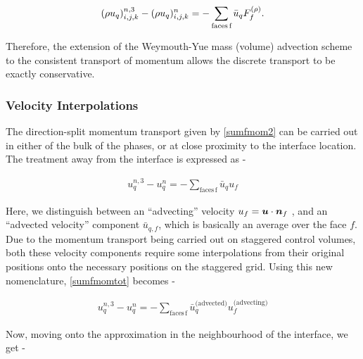 \begin{align}
	{(\rho u_{q})_{i,j,k}^{n,3} - (\rho u_{q})_{i,j,k}^{n}} =  - \sum_{\textrm{faces} \, \textrm{f}}  \bar u_{q}  F^{(\rho)}_{f} . 
\label{sumfmomtotfracstep}
\end{align}


Therefore, the extension of the Weymouth-Yue mass (volume) 
advection scheme to the consistent
transport of momentum allows the discrete 
transport to be exactly conservative. 


\subsubsection*{Velocity Interpolations}


The direction-split momentum transport given by \eqref{sumfmom2}
can be carried out in either of the bulk of the phases, or at
close proximity to the interface location. The treatment away 
from the interface is expressed as - 



\begin{align}
{u^{n,3}_q - u_q^{n}} =  - \sum_{\textrm{faces} \, \textrm{f}}  \bar u_{q} u_f 
\label{sumfmomtot}
\end{align}


Here, we distinguish between an ``advecting'' velocity 
$u_{f}= \boldsymbol{u} \cdot \boldsymbol{n}_f $
,
and an ``advected velocity'' component $\bar u_{q,f}$, 
which is basically an average over the face $f$. 
Due to the momentum transport being carried out on 
staggered control volumes, both these velocity components
require some interpolations from their original positions
onto the necessary positions on the staggered grid.
Using this new nomenclature, \eqref{sumfmomtot} becomes -

\begin{align}
{u^{n,3}_q - u_q^{n}} =  - \sum_{\textrm{faces} \, \textrm{f}}  \bar u_{q}^{\textrm{(advected)}} 
u^{\textrm{(advecting)}}_f   
\label{sumfmomtotbulk}
\end{align}
	
Now, moving onto the approximation in the neighbourhood
of the interface, we get - 

